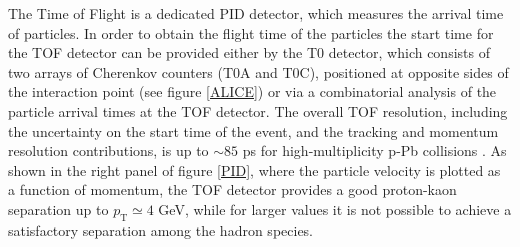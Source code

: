 \documentclass[b5paper,10pt,twoside,oldstyle,classica]{toptesi}
\newcommand{\pt}{p_\text{T}}
\begin{document}
The Time of Flight is a dedicated PID detector, which measures the arrival time of particles. In order to obtain the flight time of the particles the start time for the TOF detector can be provided either by the T0 detector, which consists of two arrays of Cherenkov counters (T0A and T0C), positioned at opposite sides of the interaction point (see figure \ref{ALICE}) or via a combinatorial analysis
of the particle  arrival times at the TOF detector. The overall TOF resolution, including the uncertainty on the start time of the event, and the tracking and momentum resolution contributions, is up to $\sim 85$ ps for high-multiplicity p-Pb collisions \cite{Abelev:2014ffa}. As shown in the right panel of figure \ref{PID}, where the particle velocity is plotted as a function of momentum, the TOF detector provides a good proton-kaon separation up to $\pt \simeq 4$ GeV, while for larger values it is not possible to achieve a satisfactory separation among the hadron species. 
\end{document}
